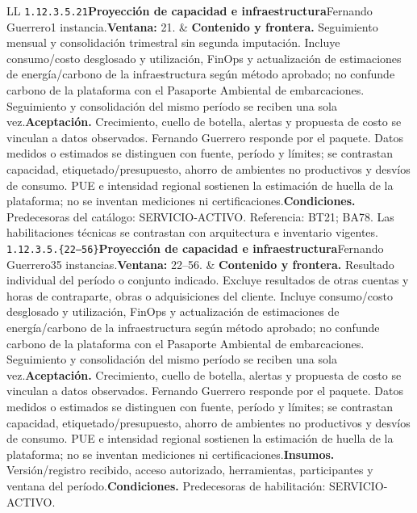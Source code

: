 \begin{longtable}{L{\tabcolsep\relax}L{\tabcolsep\relax}}
\texttt{1.\allowbreak{}12.\allowbreak{}3.\allowbreak{}5.\allowbreak{}21}\newline{}\textbf{Proyección de capacidad e infraestructura}\newline{}Fernando Guerrero\newline{}1 instancia.\newline{}\textbf{Ventana:} 21. & \textbf{Contenido y frontera.} Seguimiento mensual y consolidación trimestral sin segunda imputación. Incluye consumo/costo desglosado y utilización, FinOps y actualización de estimaciones de energía/carbono de la infraestructura según método aprobado; no confunde carbono de la plataforma con el Pasaporte Ambiental de embarcaciones. Seguimiento y consolidación del mismo período se reciben una sola vez.\newline{}\textbf{Aceptación.} Crecimiento, cuello de botella, alertas y propuesta de costo se vinculan a datos observados. Fernando Guerrero responde por el paquete. Datos medidos o estimados se distinguen con fuente, período y límites; se contrastan capacidad, etiquetado/presupuesto, ahorro de ambientes no productivos y desvíos de consumo. PUE e intensidad regional sostienen la estimación de huella de la plataforma; no se inventan mediciones ni certificaciones.\newline{}\textbf{Condiciones.} Predecesoras del catálogo: SERVICIO-ACTIVO. Referencia: BT21; BA78. Las habilitaciones técnicas se contrastan con arquitectura e inventario vigentes.\\\hline
\texttt{1.\allowbreak{}12.\allowbreak{}3.\allowbreak{}5.\allowbreak{}\{22--56\}}\newline{}\textbf{Proyección de capacidad e infraestructura}\newline{}Fernando Guerrero\newline{}35 instancias.\newline{}\textbf{Ventana:} 22--56. & \textbf{Contenido y frontera.} Resultado individual del período o conjunto indicado. Excluye resultados de otras cuentas y horas de contraparte, obras o adquisiciones del cliente. Incluye consumo/costo desglosado y utilización, FinOps y actualización de estimaciones de energía/carbono de la infraestructura según método aprobado; no confunde carbono de la plataforma con el Pasaporte Ambiental de embarcaciones. Seguimiento y consolidación del mismo período se reciben una sola vez.\newline{}\textbf{Aceptación.} Crecimiento, cuello de botella, alertas y propuesta de costo se vinculan a datos observados. Fernando Guerrero responde por el paquete. Datos medidos o estimados se distinguen con fuente, período y límites; se contrastan capacidad, etiquetado/presupuesto, ahorro de ambientes no productivos y desvíos de consumo. PUE e intensidad regional sostienen la estimación de huella de la plataforma; no se inventan mediciones ni certificaciones.\newline{}\textbf{Insumos.} Versión/registro recibido, acceso autorizado, herramientas, participantes y ventana del período.\newline{}\textbf{Condiciones.} Predecesoras de habilitación: SERVICIO-ACTIVO.\\\hline

\end{longtable}
